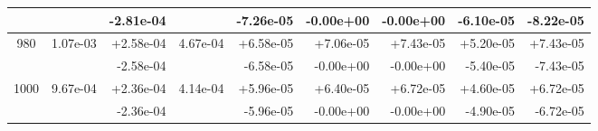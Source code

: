 \begin{tabular}{|c|r|r|r|r|r|r|r|r|}
 & & -2.81e-04  & & -7.26e-05 & -0.00e+00 & -0.00e+00 & -6.10e-05 & -8.22e-05 \\
\hline
980 & 1.07e-03 & +2.58e-04 & 4.67e-04 & +6.58e-05 & +7.06e-05 & +7.43e-05 & +5.20e-05 & +7.43e-05 \\
 & & -2.58e-04  & & -6.58e-05 & -0.00e+00 & -0.00e+00 & -5.40e-05 & -7.43e-05 \\
\hline
1000 & 9.67e-04 & +2.36e-04 & 4.14e-04 & +5.96e-05 & +6.40e-05 & +6.72e-05 & +4.60e-05 & +6.72e-05 \\
 & & -2.36e-04  & & -5.96e-05 & -0.00e+00 & -0.00e+00 & -4.90e-05 & -6.72e-05 \\
\hline
\end{tabular}
